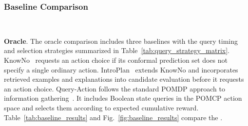 \subsubsection{Baseline Comparison}~\label{exp:sys_baseline}

\noindent\textbf{Oracle}. The oracle comparison includes three baselines with the query timing and selection strategies summarized in Table~\ref{tab:query_strategy_matrix}. KnowNo~\cite{ren2023robots} requests an action choice if its conformal prediction set does not specify a single ordinary action. IntroPlan~\cite{liang2024introspective} extends KnowNo and incorporates retrieved examples and explanations into candidate evaluation before it requests an action choice. Query-Action follows the standard POMDP approach to information gathering~\cite{kaelbling1998planning}. It includes Boolean state queries in the POMCP action space and selects them according to expected cumulative reward. Table~\ref{tab:baseline_results} and Fig.~\ref{fig:baseline_results} compare the  . 

